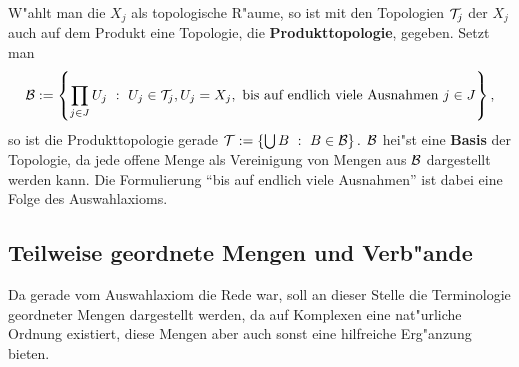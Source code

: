 W"ahlt man die $X_j$ als topologische R"aume, so ist mit den Topologien
${\cal T}_j$ der $X_j$ auch auf dem Produkt eine Topologie, die
{\bf Produkttopologie},  gegeben. Setzt man
$${\cal B}:=\left\{\prod\limits_{j\in J}U_j~:~U_j\in{\cal T}_j, U_j=X_j,\mbox{ bis auf
endlich viele Ausnahmen } j\in J\right\},$$
so ist die Produkttopologie gerade ${\cal T} := \left\{\bigcup B~:~B\in{\cal B}\right\}.$
${\cal B}$ hei"st eine {\bf Basis} der Topologie, da jede
offene Menge als Vereinigung von Mengen aus ${\cal B}$ dargestellt werden kann. Die
Formulierung "`bis auf endlich viele Ausnahmen"' ist dabei eine Folge des
Auswahlaxioms.

\subsection{Teilweise geordnete Mengen und Verb"ande}

Da gerade vom Auswahlaxiom die Rede war, soll an dieser Stelle die Terminologie
geordneter Mengen dargestellt werden, da auf Komplexen eine nat"urliche Ordnung
existiert, diese Mengen aber auch sonst eine hilfreiche Erg"anzung bieten.

